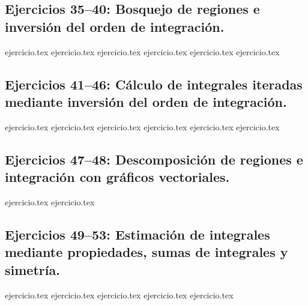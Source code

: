 \subsection*{Ejercicios 35--40: Bosquejo de regiones e inversión del orden de integración.}
\begin{enumerate}
    \setcounter{enumi}{34}
    {ejercicio.tex}
    {ejercicio.tex}
    {ejercicio.tex}
    {ejercicio.tex}
    {ejercicio.tex}
    {ejercicio.tex}
\end{enumerate}

\subsection*{Ejercicios 41--46: Cálculo de integrales iteradas mediante inversión del orden de integración.}
\begin{enumerate}
    \setcounter{enumi}{40}
    {ejercicio.tex}
    {ejercicio.tex}
    {ejercicio.tex}
    {ejercicio.tex}
    {ejercicio.tex}
    {ejercicio.tex}
\end{enumerate}

\subsection*{Ejercicios 47--48: Descomposición de regiones e integración con gráficos vectoriales.}
\begin{enumerate}
    \setcounter{enumi}{46}
    {ejercicio.tex}
    {ejercicio.tex}
\end{enumerate}

\subsection*{Ejercicios 49--53: Estimación de integrales mediante propiedades, sumas de integrales y simetría.}
\begin{enumerate}
    \setcounter{enumi}{48}
    {ejercicio.tex}
    {ejercicio.tex}
    {ejercicio.tex}
    {ejercicio.tex}
    {ejercicio.tex}
\end{enumerate}
